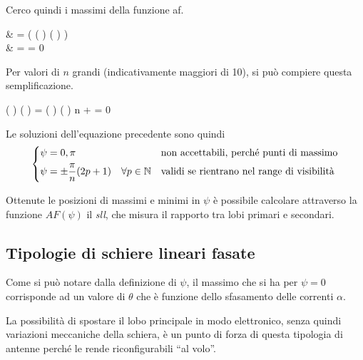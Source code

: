 			Cerco quindi i massimi della funzione \gls{af}.
			
			\begin{esp}
				& = \deriv{}{\psi} \left(
						\frac
							{ \sin(\frac{n}{2} \psi) }
							{ \sin( \frac{\psi}{2} ) }
					\right) \\
				& = \frac{1}{\sin^2 \frac{\psi}{2}} \left[
					\cos \left( \psi \right) \frac{n}{2} \sin\left(  \right) 
					- \sin \left(\frac{n}{2} \psi \right) \cos\left( \frac{\psi}{2} \right)
					\right]
				 = 0
			\end{esp} 
			
			Per valori di $n$ grandi (indicativamente maggiori di 10), si può compiere questa semplificazione.
			
			\begin{esp}
				\cos \left( \psi \right) \sin\left( \frac{\psi}{2} \right)
				=  \sin \left( \psi \right) \cos\left( \frac{\psi}{2} \right)
				 \quad \forall n \to +\infty
				 = 0
			\end{esp} 
			
			Le soluzioni dell'equazione precedente sono quindi
			\begin{equation*}
				\begin{dcases}
					\psi = 0, \pi 
						& \text{non accettabili, perché punti di massimo} \\
					\psi = \pm \frac{\pi}{n} (2p + 1) \quad \forall p \in \mathbb{N}
						& \text{validi se rientrano nel range di visibilità}
				\end{dcases}
			\end{equation*}

			Ottenute le posizioni di massimi e minimi in $\psi$ è possibile calcolare attraverso la funzione $AF(\psi)$ il \emph{\gls{sll}}, che misura il rapporto tra lobi primari e secondari.

	\subsection{Tipologie di schiere lineari fasate}
		Come si può notare dalla definizione di $\psi$, il massimo che si ha per $\psi = 0$ corrisponde ad un valore di $\theta$ che è funzione dello sfasamento delle correnti $\alpha$.
		
		La possibilità di spostare il lobo principale in modo elettronico, senza quindi variazioni meccaniche della schiera, è un punto di forza di questa tipologia di antenne perché le rende riconfigurabili ``al volo''.
		
